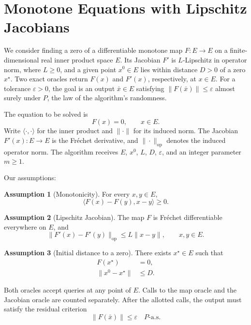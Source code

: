 \documentclass[10pt]{article}
\theoremstyle{definition}
\newtheorem{assumption}{Assumption}
\begin{document}
\section*{Monotone Equations with Lipschitz Jacobians}
We consider finding a zero of a differentiable monotone map $F:E\to E$ on a finite-dimensional real inner product space $E$. Its Jacobian $F'$ is $L$-Lipschitz in operator norm, where $L\geq 0$, and a given point $x^0\in E$ lies within distance $D>0$ of a zero $x^\star$. Two exact oracles return $F(x)$ and $F'(x)$, respectively, at $x\in E$. For a tolerance $\varepsilon>0$, the goal is an output $\bar{x}\in E$ satisfying $\|F(\bar{x})\|\leq\varepsilon$ almost surely under $P$, the law of the algorithm's randomness.

The equation to be solved is
\[
F(x)=0,\qquad x\in E.
\]
Write $\langle\cdot,\cdot\rangle$ for the inner product and $\|\cdot\|$ for its induced norm. The Jacobian $F'(x):E\to E$ is the Fr\'echet derivative, and $\|\cdot\|_{\mathrm{op}}$ denotes the induced operator norm. The algorithm receives $E$, $x^0$, $L$, $D$, $\varepsilon$, and an integer parameter $m\geq 1$.

Our assumptions:
\begin{assumption}[Monotonicity]
For every $x,y\in E$,
\[
\langle F(x)-F(y),x-y\rangle\geq 0.
\]
\end{assumption}

\begin{assumption}[Lipschitz Jacobian]
The map $F$ is Fr\'echet differentiable everywhere on $E$, and
\[
\|F'(x)-F'(y)\|_{\mathrm{op}}\leq L\|x-y\|,
\qquad x,y\in E.
\]
\end{assumption}

\begin{assumption}[Initial distance to a zero]
There exists $x^\star\in E$ such that
\[
\begin{aligned}
F(x^\star)&=0,\\
\|x^0-x^\star\|&\leq D.
\end{aligned}
\]
\end{assumption}

Both oracles accept queries at any point of $E$. Calls to the map oracle and the Jacobian oracle are counted separately. After the allotted calls, the output must satisfy the residual criterion
\[
\|F(\bar{x})\|\leq\varepsilon
\quad P\text{-a.s.}
\]
\end{document}
